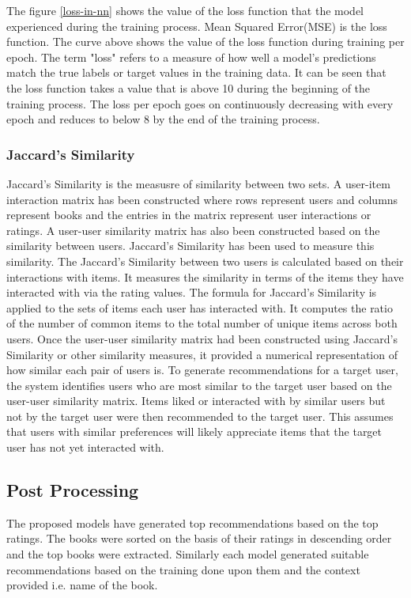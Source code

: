 The figure \ref{loss-in-nn} shows the value of the loss function that the model experienced during the training process. Mean Squared Error(MSE) is the loss function. The curve above shows the value of the loss function during training per epoch. The term "loss" refers to a measure of how well a model's predictions match the true labels or target values in the training data. It can be seen that the loss function takes a value that is above 10 during the beginning of the training process. The loss per epoch goes on continuously decreasing with every epoch and reduces to below 8 by the end of the training process.


\subsubsection*{ Jaccard's Similarity}
Jaccard's Similarity is the measusre of similarity between two sets. A user-item interaction matrix has been constructed where rows represent users and columns represent books and the entries in the matrix represent user interactions or ratings. A user-user similarity matrix has also been constructed based on the similarity between users. Jaccard's Similarity has been used to measure this similarity. The Jaccard's Similarity between two users is calculated based on their interactions with items. It measures the similarity in terms of the items they have interacted with via the rating values. The formula for Jaccard's Similarity is applied to the sets of items each user has interacted with. It computes the ratio of the number of common items to the total number of unique items across both users. Once the user-user similarity matrix had been constructed using Jaccard's Similarity or other similarity measures, it provided a numerical representation of how similar each pair of users is. To generate recommendations for a target user, the system identifies users who are most similar to the target user based on the user-user similarity matrix. Items liked or interacted with by similar users but not by the target user were then recommended to the target user. This assumes that users with similar preferences will likely appreciate items that the target user has not yet interacted with.


\subsection{Post Processing}
The proposed models have generated top recommendations based on the top ratings. The books were sorted on the basis of their ratings in descending order and the top books were extracted. Similarly each model generated suitable recommendations based on the training done upon them and the context provided i.e. name of the book.

